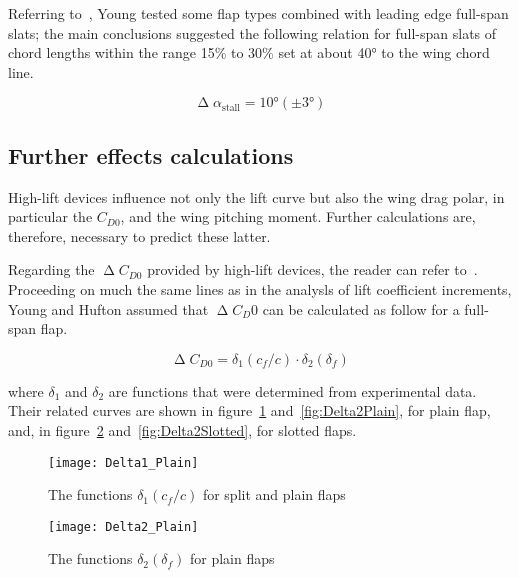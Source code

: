 Referring to~\cite{Young:Flaps}, Young tested some flap types combined with leading edge full-span slats; the main conclusions suggested the following relation for full-span slats of chord lengths within the range 15\% to 30\% set at about 40° to the wing chord line.

\begin{equation}
\upDelta\alpha_{\text{stall}}=\ang{10}(\pm\ang{3})
\label{eqn:DeltaAlphaMaxSlat}
\end{equation}

\subsection{Further effects calculations}
High-lift devices influence not only the lift curve but also the wing drag polar, in particular the $C_{D0}$, and the wing pitching moment. Further calculations are, therefore, necessary to predict these latter.

\bigskip
\noindent
Regarding the $\upDelta C_{D0}$ provided by high-lift devices, the reader can refer to~\cite{Young:Flaps}. Proceeding on much the same lines as in the analysls of lift coefficient increments, Young and Hufton assumed that  $\upDelta C_D0$ can be calculated as follow for a full-span flap.

\begin{equation}
\upDelta C_{D0}=\delta_1\left(c_f/c\right)\cdot\delta_2\left(\delta_f\right)
\label{eqn:DeltaCD0FullSpan}
\end{equation}

where $\delta_1$ and $\delta_2$ are functions that were determined from experimental data. Their related curves are shown in figure~\ref{fig:Delta1Plain} and~\ref{fig:Delta2Plain}, for plain flap, and, in figure~\ref{fig:Delta1Slotted} and~\ref{fig:Delta2Slotted}, for slotted flaps.

\begin{figure}[!b]
  \centering
  \texttt{[image: Delta1\_Plain]}
  \caption{The functions $\delta_1\left(c_f/c\right)$ for split and plain flaps}
  \label{fig:Delta1Plain}
\end{figure}

\begin{figure}[H]
  \centering
  \texttt{[image: Delta2\_Plain]}
  \caption{The functions $\delta_2\left(\delta_f\right)$ for plain flaps}
  \label{fig:Delta1Slotted}
\end{figure}

